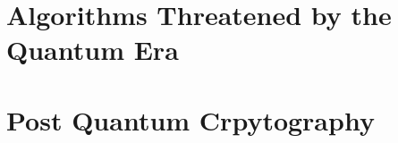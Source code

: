 \documentclass[journal]{IEEEtran}
\begin{document}
\section{Algorithms Threatened by the Quantum Era}

\section{Post Quantum Crpytography}

%
%



%
%
\end{document}
